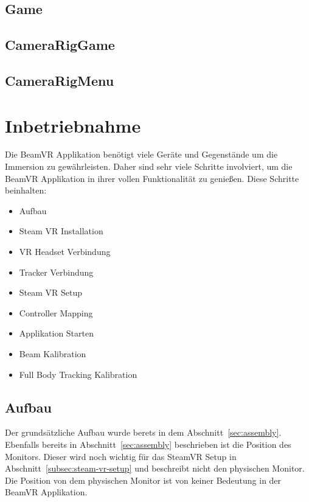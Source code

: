 \subsection{Game}\label{subsec:game-prefab}
\subsection{CameraRigGame}\label{subsec:camera-rig-game-prefab}
\subsection{CameraRigMenu}\label{subsec:camera-rig-menu-prefab}
\section{Inbetriebnahme}\label{sec:commissioning}

Die BeamVR Applikation benötigt viele Geräte und Gegenstände um die Immersion zu gewährleisten.
Daher sind sehr viele Schritte involviert, um die BeamVR Applikation in ihrer vollen Funktionalität zu genießen.
Diese Schritte beinhalten:

\begin{itemize}
    \item Aufbau
    \item Steam VR Installation
    \item VR Headset Verbindung
    \item Tracker Verbindung
    \item Steam VR Setup
    \item Controller Mapping
    \item Applikation Starten
    \item Beam Kalibration
    \item Full Body Tracking Kalibration
\end{itemize}


\subsection{Aufbau}

Der grundsätzliche Aufbau wurde berets in dem Abschnitt~\ref{sec:assembly}.
Ebenfalls bereits in Abschnitt~\ref{sec:assembly} beschrieben ist die Position des Monitors.
Dieser wird noch wichtig für das SteamVR Setup in Abschnitt~\ref{subsec:steam-vr-setup} und beschreibt nicht den physischen Monitor.
Die Position von dem physischen Monitor ist von keiner Bedeutung in der BeamVR Applikation.

